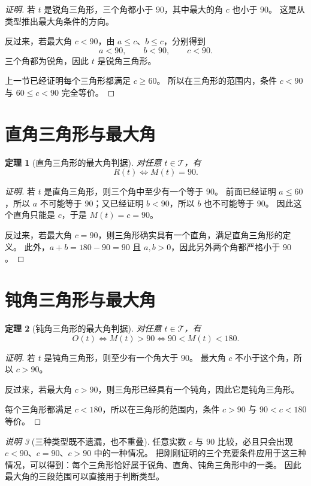 \documentclass[UTF8,a4paper,zihao=-4,oneside,openany,fontset=fandol]{ctexbook}
\newtheorem{theorem}{定理}[chapter]
\theoremstyle{definition}
\theoremstyle{remark}
\newtheorem{remark}[theorem]{说明}
\begin{document}
\begin{proof}[证明]
若 $t$ 是锐角三角形，三个角都小于 $90$，其中最大的角 $c$ 也小于 $90$。
这是从类型推出最大角条件的方向。

反过来，若最大角 $c<90$，由 $a\le c$、$b\le c$，分别得到
\[
a<90,\qquad b<90,\qquad c<90.
\]
三个角都为锐角，因此 $t$ 是锐角三角形。

上一节已经证明每个三角形都满足 $c\ge60$。
所以在三角形的范围内，条件 $c<90$ 与 $60\le c<90$ 完全等价。
\end{proof}

\section{直角三角形与最大角}

\begin{theorem}[直角三角形的最大角判据]
对任意 $t\in\mathcal T$，有
\[
R(t)\Longleftrightarrow M(t)=90.
\]
\end{theorem}

\begin{proof}[证明]
若 $t$ 是直角三角形，则三个角中至少有一个等于 $90$。
前面已经证明 $a\le60$，所以 $a$ 不可能等于 $90$；又已经证明 $b<90$，所以 $b$ 也不可能等于 $90$。
因此这个直角只能是 $c$，于是 $M(t)=c=90$。

反过来，若最大角 $c=90$，则三角形确实具有一个直角，满足直角三角形的定义。
此外，$a+b=180-90=90$ 且 $a,b>0$，因此另外两个角都严格小于 $90$。
\end{proof}

\section{钝角三角形与最大角}

\begin{theorem}[钝角三角形的最大角判据]
对任意 $t\in\mathcal T$，有
\[
O(t)\Longleftrightarrow M(t)>90
\Longleftrightarrow90<M(t)<180.
\]
\end{theorem}

\begin{proof}[证明]
若 $t$ 是钝角三角形，则至少有一个角大于 $90$。
最大角 $c$ 不小于这个角，所以 $c>90$。

反过来，若最大角 $c>90$，则三角形已经具有一个钝角，因此它是钝角三角形。

每个三角形都满足 $c<180$，所以在三角形的范围内，条件 $c>90$ 与 $90<c<180$ 等价。
\end{proof}

\begin{remark}[三种类型既不遗漏，也不重叠]
任意实数 $c$ 与 $90$ 比较，必且只会出现 $c<90$、$c=90$、$c>90$ 中的一种情况。
把刚刚证明的三个充要条件应用于这三种情况，可以得到：每个三角形恰好属于锐角、直角、钝角三角形中的一类。
因此最大角的三段范围可以直接用于判断类型。
\end{remark}
\end{document}
